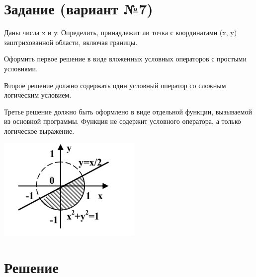\documentclass[12pt]{article}
\begin{document}
\section*{Задание (вариант №7)}
Даны числа x и y. Определить, принадлежит ли точка с координатами (x, y) заштрихованной области, включая границы.

Оформить первое решение в виде вложенных условных операторов с простыми условиями.

Второе решение должно содержать один условный оператор со сложным логическим условием.

Третье решение должно быть оформлено в виде отдельной функции, вызываемой из основной программы. Функция не содержит условного оператора, а только логическое выражение.

\includegraphics{img1}

\newpage


\section*{Решение}

\end{document}
